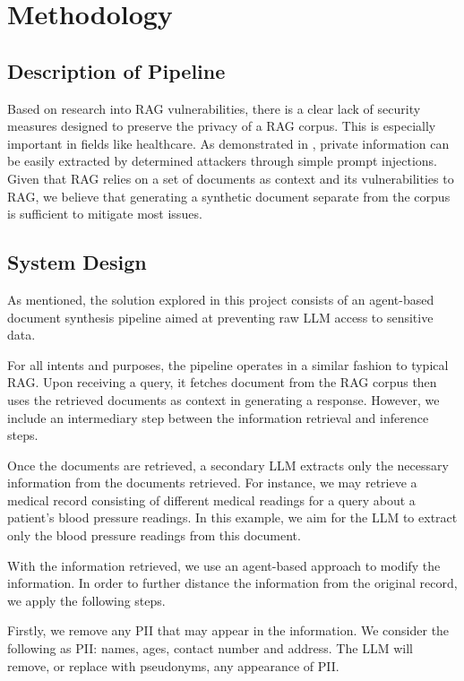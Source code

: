 \chapter{Methodology} \label{methodology}
\section{Description of Pipeline}
Based on research into RAG vulnerabilities, there is a clear lack of security measures designed to preserve the privacy of a RAG corpus. This is especially important in fields like healthcare.
As demonstrated in \autocite{zeng2024goodbadexploringprivacy}, private information can be easily extracted by determined attackers through simple prompt injections.
Given that RAG relies on a set of documents as context and its vulnerabilities to RAG, we believe that generating a synthetic document separate from the corpus is sufficient to mitigate most issues.

\section{System Design}
As mentioned, the solution explored in this project consists of an agent-based document synthesis pipeline aimed at preventing raw LLM access to sensitive data.

For all intents and purposes, the pipeline operates in a similar fashion to typical RAG. Upon receiving a query, it fetches document from the RAG corpus then uses the retrieved documents as context in generating a response. However, we include an intermediary step between the information retrieval and inference steps.

Once the documents are retrieved, a  secondary LLM extracts only the necessary information from the documents retrieved. For instance, we may retrieve a medical record consisting of different medical readings for a query about a patient's blood pressure readings. In this example, we aim for the LLM to extract only the blood pressure readings from this document.

With the information retrieved, we use an agent-based approach to modify the information. In order to further distance the information from the original record, we apply the following steps.

Firstly, we remove any PII that may appear in the information. We consider the following as PII: names, ages, contact number and address. The LLM will remove, or replace with pseudonyms, any appearance of PII.

